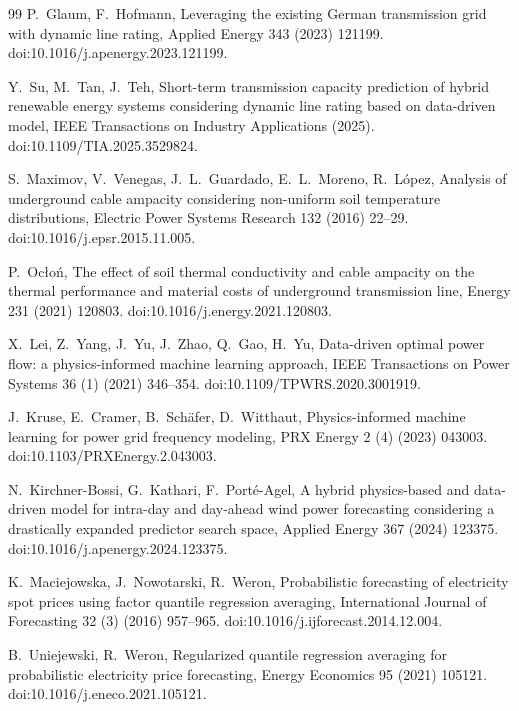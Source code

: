 \documentclass[preprint,3p,times]{elsarticle}
\providecommand{\DIFaddtex}[1]{{\protect\color{blue} \sf #1}} %
\providecommand{\DIFadd}[1]{\texorpdfstring{\DIFaddtex{#1}}{#1}} %
\begin{document}
\begin{thebibliography}{99}
\DIFadd{P.~Glaum, F.~Hofmann,
Leveraging the existing German transmission grid with dynamic line rating,
Applied Energy 343 (2023) 121199.
doi:10.1016/j.apenergy.2023.121199.
}

\DIFadd{Y.~Su, M.~Tan, J.~Teh,
Short-term transmission capacity prediction of hybrid renewable energy systems considering dynamic line rating based on data-driven model,
IEEE Transactions on Industry Applications (2025).
doi:10.1109/TIA.2025.3529824.
}

\DIFadd{S.~Maximov, V.~Venegas, J.~L.~Guardado, E.~L.~Moreno, R.~L\'opez,
Analysis of underground cable ampacity considering non-uniform soil temperature distributions,
Electric Power Systems Research 132 (2016) 22--29.
doi:10.1016/j.epsr.2015.11.005.
}

\DIFadd{P.~Ocło\'n,
The effect of soil thermal conductivity and cable ampacity on the thermal performance and material costs of underground transmission line,
Energy 231 (2021) 120803.
doi:10.1016/j.energy.2021.120803.
}

\DIFadd{X.~Lei, Z.~Yang, J.~Yu, J.~Zhao, Q.~Gao, H.~Yu,
Data-driven optimal power flow: a physics-informed machine learning approach,
IEEE Transactions on Power Systems 36 (1) (2021) 346--354.
doi:10.1109/TPWRS.2020.3001919.
}

\DIFadd{J.~Kruse, E.~Cramer, B.~Sch\"afer, D.~Witthaut,
Physics-informed machine learning for power grid frequency modeling,
PRX Energy 2 (4) (2023) 043003.
doi:10.1103/PRXEnergy.2.043003.
}

\DIFadd{N.~Kirchner-Bossi, G.~Kathari, F.~Port\'e-Agel,
A hybrid physics-based and data-driven model for intra-day and day-ahead wind power forecasting considering a drastically expanded predictor search space,
Applied Energy 367 (2024) 123375.
doi:10.1016/j.apenergy.2024.123375.
}

\DIFadd{K.~Maciejowska, J.~Nowotarski, R.~Weron,
Probabilistic forecasting of electricity spot prices using factor quantile regression averaging,
International Journal of Forecasting 32 (3) (2016) 957--965.
doi:10.1016/j.ijforecast.2014.12.004.
}

\DIFadd{B.~Uniejewski, R.~Weron,
Regularized quantile regression averaging for probabilistic electricity price forecasting,
Energy Economics 95 (2021) 105121.
doi:10.1016/j.eneco.2021.105121.
}


\end{thebibliography}
\end{document}
